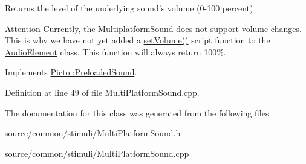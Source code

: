 Returns the level of the underlying sound's volume (0-\/100 percent) 

\begin{DoxyAttention}{Attention}
Currently, the \hyperlink{class_picto_1_1_multiplatform_sound}{Multiplatform\-Sound} does not support volume changes. This is why we have not yet added a \hyperlink{class_picto_1_1_multiplatform_sound_a45b56fa2cc55812c7bcca3c7123dfe87}{set\-Volume()} script function to the \hyperlink{class_picto_1_1_audio_element}{Audio\-Element} class. This function will always return 100\%. 
\end{DoxyAttention}


Implements \hyperlink{class_picto_1_1_preloaded_sound_a6383e1a60e25b51815d1876b1b29a899}{Picto\-::\-Preloaded\-Sound}.



Definition at line 49 of file Multi\-Platform\-Sound.\-cpp.



The documentation for this class was generated from the following files\-:\begin{DoxyCompactItemize}
\item 
source/common/stimuli/Multi\-Platform\-Sound.\-h\item 
source/common/stimuli/Multi\-Platform\-Sound.\-cpp\end{DoxyCompactItemize}

